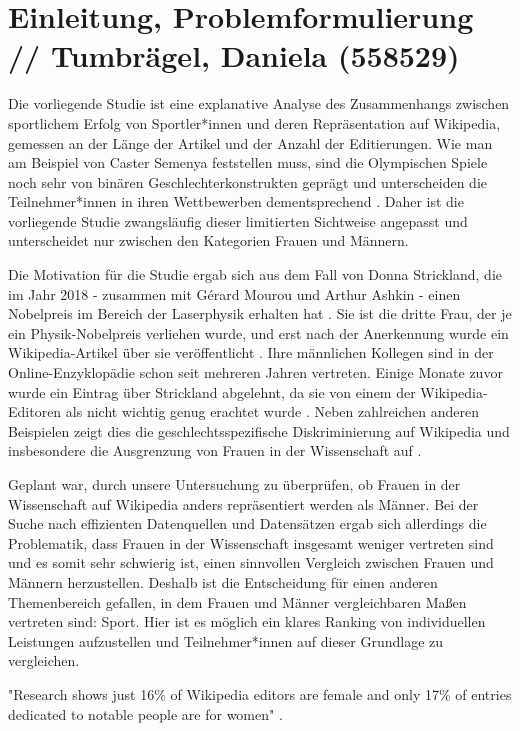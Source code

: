 \documentclass[11pt]{article}
\begin{document}
\section {Einleitung, Problemformulierung // Tumbrägel, Daniela (558529)}

Die vorliegende Studie ist eine explanative Analyse des Zusammenhangs zwischen sportlichem Erfolg von Sportler*innen und deren Repräsentation auf Wikipedia, gemessen an der Länge der Artikel und der Anzahl der Editierungen. Wie man am Beispiel von Caster Semenya feststellen muss, sind die Olympischen Spiele noch sehr von binären Geschlechterkonstrukten geprägt und unterscheiden die Teilnehmer*innen in ihren Wettbewerben dementsprechend \parencite{IOCRules}. Daher ist die vorliegende Studie zwangsläufig dieser limitierten Sichtweise angepasst und unterscheidet nur zwischen den Kategorien Frauen und Männern.

Die Motivation für die Studie ergab sich aus dem Fall von Donna Strickland, die im Jahr 2018 - zusammen mit Gérard Mourou und Arthur Ashkin - einen Nobelpreis im Bereich der Laserphysik erhalten hat \parencite{nobelprize}. Sie ist die dritte Frau, der je ein Physik-Nobelpreis verliehen wurde, und erst nach der Anerkennung wurde ein Wikipedia-Artikel über sie veröffentlicht \parencite{Bazely2018}. Ihre männlichen Kollegen sind in der Online-Enzyklopädie schon seit mehreren Jahren vertreten. Einige Monate zuvor wurde ein Eintrag über Strickland abgelehnt, da sie von einem der Wikipedia-Editoren als nicht wichtig genug erachtet wurde \parencite{stricklandWiki}. Neben zahlreichen anderen Beispielen zeigt dies die geschlechtsspezifische Diskriminierung auf Wikipedia und insbesondere die Ausgrenzung von Frauen in der Wissenschaft auf \parencite{LeylandCecco}.

Geplant war, durch unsere Untersuchung zu überprüfen, ob Frauen in der Wissenschaft auf Wikipedia anders repräsentiert werden als Männer. Bei der Suche nach effizienten Datenquellen und Datensätzen ergab sich allerdings die Problematik, dass Frauen in der Wissenschaft insgesamt weniger vertreten sind und es somit sehr schwierig ist, einen sinnvollen Vergleich zwischen Frauen und Männern herzustellen. Deshalb ist die Entscheidung für einen anderen Themenbereich gefallen, in dem Frauen und Männer vergleichbaren Maßen vertreten sind: Sport. Hier ist es möglich ein klares Ranking von individuellen Leistungen aufzustellen und Teilnehmer*innen auf dieser Grundlage zu vergleichen.

"Research shows just 16\% of Wikipedia editors are female and only 17\% of entries dedicated to notable people are for women" \parencite{PoppyNoor}.
\end{document}
